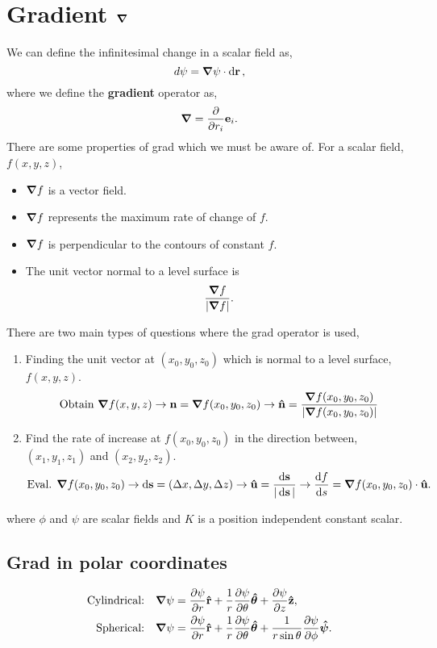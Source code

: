\documentclass{book}
\begin{document}
\section{Gradient $\grad$}
We can define the infinitesimal change in a scalar field as,
\begin{equation}
    d\psi = \grad \psi \cdot \dd{\vb{r}},
\end{equation}
where we define the \textbf{gradient} operator as,
\begin{equation}
    \grad = \pdv{}{r_i}\vb{e}_i.
\end{equation}
There are some properties of grad which we must be aware of. For a scalar field, $f(x,y,z)$,
\begin{itemize}
    \item $\grad f$ is a vector field.
    \item $\grad f$ represents the maximum rate of change of $f$.
    \item $\grad f$ is perpendicular to the contours of constant $f$.
    \item  The unit vector normal to a level surface is 
    \begin{equation}
        \frac{\grad f}{|\grad f|}.
    \end{equation}
\end{itemize}
There are two main types of questions where the grad operator is used,
\begin{enumerate}
    \item Finding the unit vector at $(x_0,y_0,z_0)$ which is normal to a level surface, $f(x,y,z)$.
    \begin{equation}
        \text{Obtain } \grad f(x,y,z) \to \vb{n} = \grad f(x_0,y_0,z_0) \to \vu{n} = \frac{\grad f(x_0,y_0,z_0)}{|\grad f(x_0,y_0,z_0)|}
    \end{equation}
    \item Find the rate of increase at $f(x_0,y_0,z_0)$ in the direction between, $(x_1,y_1,z_1)$ and $(x_2,y_2,z_2)$. 
    \begin{equation}
        \text{Eval. } \grad f(x_0,y_0,z_0) \to \dd{\vb{s}} = (\Delta x, \Delta y, \Delta z) \to \vu{u} = \frac{\dd{\vb{s}}}{|\dd{\vb{s}}|} \to \dv{f}{s} = \grad f(x_0,y_0,z_0) \cdot \vu{u}.
    \end{equation}
\end{enumerate}
where $\phi$ and $\psi$ are scalar fields and $K$ is a position independent constant scalar.
\subsection{Grad in polar coordinates}
\begin{align}
    \text{Cylindrical:} && \grad \psi & = \pdv{\psi}{r}\vu{r} + \frac{1}{r}\pdv{\psi}{\theta}\vu*{\theta} + \pdv{\psi}{z}\vu{z}, \\
    \text{Spherical:} && \grad \psi & = \pdv{\psi}{r}\vu{r} + \frac{1}{r}\pdv{\psi}{\theta}\vu*{\theta} + \frac{1}{r\sin \theta}\pdv{\psi}{\phi}\vu*{\psi}.
\end{align}
\end{document}
